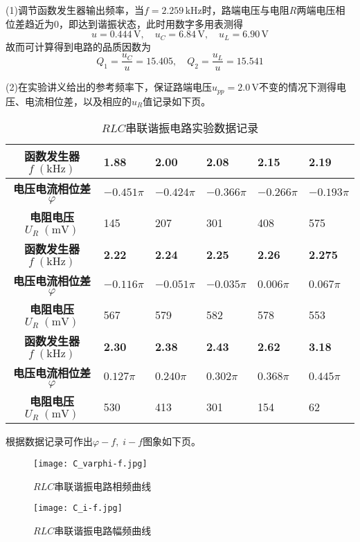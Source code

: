 \documentclass[UTF-8,twoside,cs4size]{ctexart}
\begin{document}
	(1)调节函数发生器输出频率，当$ f=2.259\,\mathrm{kHz} $时，路端电压与电阻$ R $两端电压相位差趋近为0，即达到谐振状态，此时用数字多用表测得
	\[u=0.444\,\mathrm V,\quad u_C=6.84\,\mathrm{V},\quad u_L=6.90\,\mathrm V\]
	故而可计算得到电路的品质因数为
	\[Q_1=\frac{u_C}{u}=15.405,\quad Q_2=\frac{u_L}{u}=15.541\]
	
	(2)在实验讲义给出的参考频率下，保证路端电压$ u_{pp}=2.0\,\mathrm V $不变的情况下测得电压、电流相位差，以及相应的$ u_R $值记录如下页。
	\begin{table}[!h]
		\centering
		\renewcommand\arraystretch{1.5}
		\caption{$ RLC $串联谐振电路实验数据记录}
		\begin{tabularx}{\textwidth}{|c|Y|Y|Y|Y|Y|}
			\hline
			\textbf{函数发生器}$ f\;(\mathrm{kHz}) $&\textbf{1.88}&\textbf{2.00}&\textbf{2.08}&\textbf{2.15}&\textbf{2.19}\\
			\hline
			\textbf{电压电流相位差}$ \varphi $&$-0.451\pi$&$ -0.424\pi $&$ -0.366\pi $&$ -0.266\pi $&$ -0.193\pi $\\
			\hline
			\textbf{电阻电压}$ U_R\;(\mathrm{mV}) $&145&207&301&408&575\\
			\hline
			\textbf{函数发生器}$ f\;(\mathrm{kHz}) $&\textbf{2.22}&\textbf{2.24}&\textbf{2.25}&\textbf{2.26}&\textbf{2.275}\\
			\hline
			\textbf{电压电流相位差}$ \varphi $&$ -0.116\pi $&$ -0.051\pi $&$ -0.035\pi $&$ 0.006\pi $&$ 0.067\pi $\\
			\hline
			\textbf{电阻电压}$ U_R\;(\mathrm{mV}) $&567&579&582&578&553\\
			\hline
			\textbf{函数发生器}$ f\;(\mathrm{kHz}) $&\textbf{2.30}&\textbf{2.38}&\textbf{2.43}&\textbf{2.62}&\textbf{3.18}\\
			\hline
			\textbf{电压电流相位差}$ \varphi $&$ 0.127\pi $&$ 0.240\pi $&$ 0.302\pi $&$ 0.368\pi $&$ 0.445\pi $\\
			\hline
			\textbf{电阻电压}$ U_R\;(\mathrm{mV}) $&530&413&301&154&62\\
			\hline
		\end{tabularx}
	\end{table}

	根据数据记录可作出$ \varphi-f,\;i-f $图象如下页。
	
	\begin{figure}[!h]
		\centering
		\texttt{[image: C\_varphi-f.jpg]}
		\caption{$ RLC $串联谐振电路相频曲线}
		\texttt{[image: C\_i-f.jpg]}
		\caption{$ RLC $串联谐振电路幅频曲线}
	\end{figure}
\end{document}
